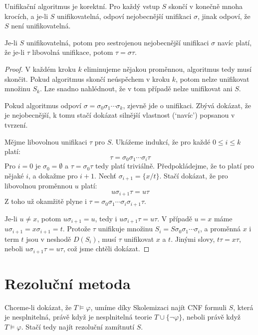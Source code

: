 \begin{proposition}\label{proposition:unification-algorithm}
Unifikační algoritmus je korektní. Pro každý vstup $S$ skončí v konečně mnoha krocích, a je-li $S$ unifikovatelná, odpoví nejobecnější unifikaci $\sigma$, jinak odpoví, že $S$ není unifikovatelná.

Je-li $S$ unifikovatelná, potom pro sestrojenou nejobecnější unifikaci $\sigma$ navíc platí, že je-li $\tau$ libovolná unifikace, potom $\tau=\sigma\tau$.
\end{proposition}
\begin{proof}
V každém kroku $k$ eliminujeme nějakou proměnnou, algoritmus tedy musí skončit. Pokud algoritmus skončí neúspěchem v kroku $k$, potom nelze unifikovat množinu $S_k$. Lze snadno nahlédnout, že v tom případě nelze unifikovat ani $S$.

Pokud algoritmus odpoví $\sigma=\sigma_0\sigma_1\cdots\sigma_k$, zjevně jde o unifikaci. Zbývá dokázat, že je nejobecnější, k tomu stačí dokázat silnější vlastnost (`navíc') popsanou v tvrzení.

Mějme libovolnou unifikaci $\tau$ pro $S$. Ukážeme indukcí, že pro každé $0\leq i\leq k$ platí:
$$
\tau=\sigma_0\sigma_1\cdots\sigma_i\tau
$$
Pro $i=0$ je $\sigma_0=\emptyset$ a $\tau=\sigma_0\tau$ tedy platí triviálně. Předpokládejme, že to platí pro nějaké $i$, a dokažme pro $i+1$. Nechť $\sigma_{i+1}=\{x/t\}$. Stačí dokázat, že pro libovolnou proměnnou $u$ platí: 
$$
u\sigma_{i+1}\tau=u\tau
$$
Z toho už okamžitě plyne i $\tau=\sigma_0\sigma_1\cdots\sigma_i\sigma_{i+1}\tau$.

Je-li $u\neq x$, potom $u\sigma_{i+1}=u$, tedy i $u\sigma_{i+1}\tau=u\tau$. V případě $u=x$ máme $u\sigma_{i+1}=x\sigma_{i+1}=t$. Protože $\tau$ unifikuje množinu $S_i=S\sigma_0\sigma_1\cdots\sigma_i$, a proměnná $x$ i term $t$ jsou v neshodě $D(S_i)$, musí $\tau$ unifikovat $x$ a $t$. Jinými slovy, $t\tau=x\tau$, neboli $u\sigma_{i+1}\tau=u\tau$, což jsme chtěli dokázat.
\end{proof}


\section{Rezoluční metoda}\label{section:predicate-resolution-method}

Chceme-li dokázat, že $T\models\varphi$, umíme díky Skolemizaci najít CNF formuli $S$, která je nesplnitelná, právě když je nesplnitelná teorie $T\cup\{\neg\varphi\}$, neboli právě když $T\models\varphi$. Stačí tedy najít rezoluční zamítnutí $S$.

